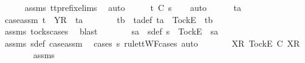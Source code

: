 \begin{isabellebody}
\ \ \ \ \isamarkupfalse%
\ assms{\isacharparenleft}{}{\isacharparenright}\ tt{\isacharunderscore}prefix{\isachardot}elims{\isacharparenleft}{}{\isacharparenright}\ \isamarkupfalse%
\ auto\isanewline
\ \ \isamarkupfalse%
\ \isamarkupfalse%
\ {\isachardoublequoteopen}t\ {\isasymle}\isactrlsub C\ s{}{\isacharprime}{\isachardoublequoteclose}\isanewline
\ \ \isamarkupfalse%
\ auto\isanewline
\ \ \ \ \isamarkupfalse%
\ ta\isanewline
\ \ \ \ \isamarkupfalse%
\ case{\isacharunderscore}assm{\isacharcolon}\ {\isachardoublequoteopen}t\ {\isacharequal}\ {\isacharbrackleft}Y{\isacharbrackright}\isactrlsub R\ {\isacharhash}\ ta{\isachardoublequoteclose}\isanewline
\ \ \ \ \isamarkupfalse%
\ \isamarkupfalse%
\ tb\ \ ta{\isacharunderscore}def{\isacharcolon}\ {\isachardoublequoteopen}ta\ {\isacharequal}\ {\isacharbrackleft}Tock{\isacharbrackright}\isactrlsub E\ {\isacharhash}\ tb{\isachardoublequoteclose}\isanewline
\ \ \ \ \ \ \isamarkupfalse%
\ assms{\isacharparenleft}{}{\isacharparenright}\ tocks{\isachardot}cases\ \isamarkupfalse%
\ blast\isanewline
\ \ \ \ \isamarkupfalse%
\ \isamarkupfalse%
\ s{}a\ \ s{}{\isacharunderscore}def{\isacharcolon}\ {\isachardoublequoteopen}s{}\ {\isacharequal}\ {\isacharbrackleft}Tock{\isacharbrackright}\isactrlsub E\ {\isacharhash}\ s{}a{\isachardoublequoteclose}\isanewline
\ \ \ \ \ \ \isamarkupfalse%
\ assms{\isacharparenleft}{}{\isacharparenright}\ s{}{\isacharprime}{\isacharunderscore}def\ case{\isacharunderscore}assm\ \isamarkupfalse%
\ {\isacharparenleft}cases\ s{}\ rule{\isacharcolon}ttWF{\isachardot}cases{\isacharcomma}\ auto{\isacharparenright}\isanewline
\ \ \ \ \isamarkupfalse%
\ \isamarkupfalse%
\ {\isachardoublequoteopen}{\isacharbrackleft}{\isacharbrackleft}X{\isacharbrackright}\isactrlsub R{\isacharcomma}\ {\isacharbrackleft}Tock{\isacharbrackright}\isactrlsub E{\isacharbrackright}\ {\isasymle}\isactrlsub C\ {\isacharbrackleft}{\isacharbrackleft}X{\isacharbrackright}\isactrlsub R{\isacharbrackright}{\isachardoublequoteclose}\isanewline
\ \ \ \ \ \ \isamarkupfalse%
\ assms{\isacharparenleft}{}{\isacharparenright}\ \isamarkupfalse%

\end{isabellebody}
